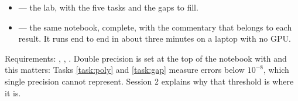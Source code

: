 \documentclass[11pt,a4paper]{article}
\begin{document}
\begin{itemize}[leftmargin=*, itemsep=3pt]
\item {} --- the lab, with the five tasks and the gaps to fill.
\item {} --- the same notebook, complete, with the commentary that belongs
to each result. It runs end to end in about three minutes on a laptop with no GPU.
\end{itemize}

\vspace{4pt}
\noindent
{\small Requirements: , , . Double precision is set at the
top of the notebook with  and this matters: Tasks
\ref{task:poly} and \ref{task:gap} measure errors below $10^{-8}$, which single precision cannot
represent. Session 2 explains why that threshold is where it is.}
\end{document}
